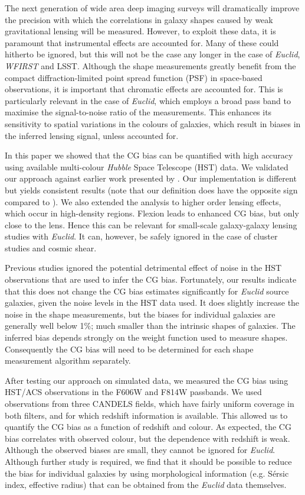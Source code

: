 \documentclass[useAMS,usenatbib]{mnras}
\begin{document}
The next generation of wide area deep imaging surveys will dramatically improve the precision with which the correlations in galaxy shapes caused by weak gravitational lensing will be measured. However, to exploit these data, it is paramount that instrumental effects are accounted for. Many of these could hitherto be ignored, but this will not be the case any longer in the case of {\it Euclid}, {\it WFIRST} and LSST.
Although the shape measurements greatly benefit from the compact diffraction-limited point spread function (PSF) in space-based observations, it is important that chromatic effects are accounted for. This is particularly relevant in the case of {\it Euclid}, which employs a broad pass band to maximise the signal-to-noise ratio of the measurements. This enhances its sensitivity to spatial variations in the colours of galaxies,
which result in biases in the inferred lensing signal, unless accounted for.

In this paper we showed that the CG bias can be quantified with high accuracy using available multi-colour {\it Hubble} Space Telescope (HST) data. We validated our approach against earlier work presented by
. Our implementation is different but yields consistent results (note that our definition does have the opposite sign compared to ). We also extended the analysis to higher order lensing effects, which occur in high-density regions. Flexion leads to enhanced CG bias, but only close to the lens. Hence this can be relevant for small-scale galaxy-galaxy lensing studies with {\it Euclid}. It can, however, be safely ignored in the case of cluster studies and cosmic shear.

Previous studies ignored the potential detrimental effect of noise in the HST observations that are used to infer the CG bias. Fortunately, our results indicate that this does not change the CG bias estimates significantly for {\it Euclid} source galaxies, given the noise levels in the HST data used. It does slightly increase the noise in the shape measurements, but the biases for individual galaxies are generally well below 1\%; much smaller than the intrinsic shapes of galaxies. The inferred bias depends strongly on the weight function used to measure shapes. Consequently the CG bias will need to be determined for each shape measurement algorithm separately.

After testing our approach on simulated data, we measured the CG bias using HST/ACS observations
in the F606W and F814W passbands. We used observations from three CANDELS fields, which have
fairly uniform coverage in both filters, and for which redshift information is available. This allowed us to quantify the CG bias as a function of redshift and colour. As expected, the CG bias correlates with observed colour, but the dependence with redshift is weak. Although the observed biases are small, they cannot be ignored for {\it Euclid}. Although further study is required, we find that it should be possible to reduce the bias for individual galaxies by using morphological information (e.g. S{\'e}rsic index, effective radius) that can be obtained from the {\it Euclid} data themselves.
\end{document}
